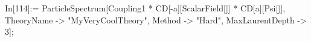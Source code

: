 In[114]:= ParticleSpectrum[Coupling1 * CD[-a][ScalarField[]] * CD[a][Psi[]], TheoryName -> "MyVeryCoolTheory", Method -> "Hard", MaxLaurentDepth -> 3]; 